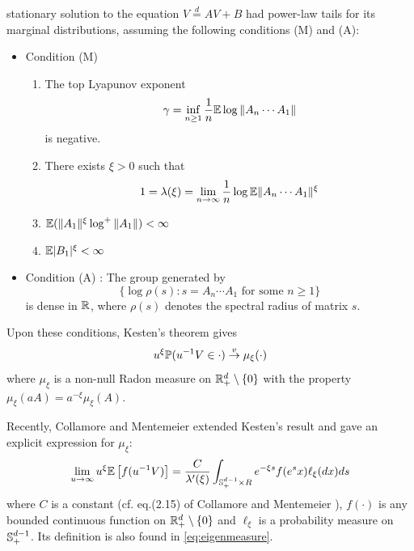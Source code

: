stationary solution to the equation
$V \overset{d}{=} A V + B$ had power-law tails
for its marginal distributions, assuming the following conditions (M)
and (A):
\begin{itemize}
\item Condition (M)
  \begin{enumerate}
  \item The top Lyapunov exponent
    \[
    \gamma = \inf_{n \geq 1} {1 \over n}\mathbb{E} \log \|A_n \cdots A_1\|
    \]
    is negative.
  \item There exists $\xi > 0$ such that
    \[
    1 = \lambda(\xi) = \lim_{n \to \infty} {1 \over n} \log \mathbb{E} \|A_n \cdots A_1\|^\xi
    \]
  \item $\mathbb{E} (\|A_1\|^\xi \log^+\|A_1\|) < \infty$
  \item $\mathbb{E} |B_1|^\xi < \infty$
  \end{enumerate}
\item Condition (A) : The group generated by
  \[
  \{\log\rho(s): s = A_n \cdots A_1 \text{ for some } n \geq 1\}
  \]
  is dense in $\mathbb R$, where $\rho(s)$ denotes the spectral
  radius of matrix $s$.
\end{itemize}
Upon these conditions, Kesten's theorem gives
\begin{equation}
  \label{eq:kesten}
  u^\xi \P(u^{-1} V \in \cdot) \overset{v}{\to} \mu_\xi(\cdot)
\end{equation}
where $\mu_\xi$ is a non-null Radon measure on
$\mathbb R^d_+ \setminus \{0\}$ with the property
$\mu_\xi(a A) = a^{-\xi} \mu_\xi(A)$.

Recently, Collamore and Mentemeier \cite{collamore:mentemeier:2016}
extended Kesten's result and gave an explicit expression for $\mu_\xi$:
\begin{equation}
  \label{eq:CollamoreMentemeier}
  \lim_{u \to \infty} u^{\xi} \E \left[
    f(u^{-1} V)
    \right]
  =
  {C \over \lambda'(\xi)}  
  \int_{\sphere^{d-1}_+ \times R} e^{-\xi s} f(e^s x) \ell_\xi(dx) ds
\end{equation}
where $C$ is a constant (cf. eq.(2.15) of Collamore and Mentemeier
\cite{collamore:mentemeier:2016}), $f(\cdot)$ is any bounded
continuous function on $\mathbb R^{d}_+ \setminus \{0\}$  and
$\ell_\xi$ is a probability measure on $\mathbb S_+^{d-1}$. Its definition
is also found in \eqref{eq:eigenmeasure}.

